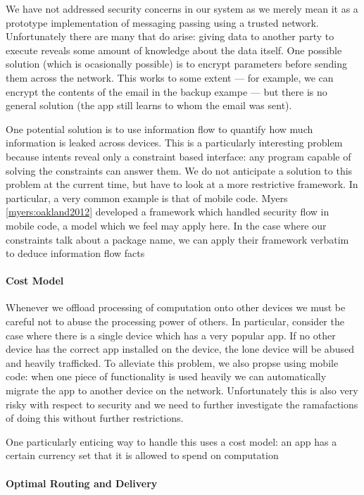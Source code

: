 \documentclass{acm_proc_article-sp}
\begin{document}
We have not addressed security concerns in our system as we merely
mean it as a prototype implementation of messaging passing using a
trusted network.  Unfortunately there are many that do arise: giving
data to another party to execute reveals some amount of knowledge
about the data itself.  One possible solution (which is ocasionally
possible) is to encrypt parameters before sending them across the
network.  This works to some extent --- for example, we can encrypt
the contents of the email in the backup exampe --- but there is no
general solution (the app still learns to whom the email was sent).

One potential solution is to use information flow to quantify how much
information is leaked across devices.  This is a particularly
interesting problem because intents reveal only a constraint based
interface: any program capable of solving the constraints can answer
them.  We do not anticipate a solution to this problem at the current
time, but have to look at a more restrictive framework.  In
particular, a very common example is that of mobile code.  Myers
\ref{myers:oakland2012} developed a framework which handled security
flow in mobile code, a model which we feel may apply here.  In the
case where our constraints talk about a package name, we can apply
their framework verbatim to deduce information flow facts

\paragraph{Cost Model}

Whenever we offload processing of computation onto other devices we
must be careful not to abuse the processing power of others.  In
particular, consider the case where there is a single device which has
a very popular app.  If no other device has the correct app installed
on the device, the lone device will be abused and heavily trafficked.
To alleviate this problem, we also propse using mobile code: when one
piece of functionality is used heavily we can automatically migrate
the app to another device on the network.  Unfortunately this is also
very risky with respect to security and we need to further investigate
the ramafactions of doing this without further restrictions.

One particularly enticing way to handle this uses a cost model: an app
has a certain currency set that it is allowed to spend on computation

\paragraph{Optimal Routing and Delivery}
\end{document}
